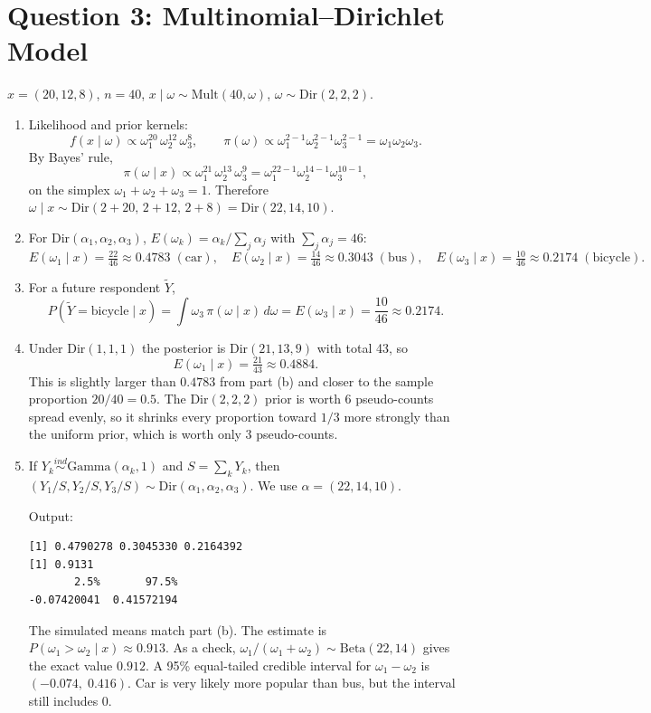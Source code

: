 \documentclass[11pt]{article}
\begin{document}
\section*{Question 3: Multinomial--Dirichlet Model}

$x = (20, 12, 8)$, $n = 40$, $x \mid \omega \sim \text{Mult}(40, \omega)$, $\omega \sim \text{Dir}(2,2,2)$.

\begin{enumerate}
\item Likelihood and prior kernels:
\[
f(x\mid\omega) \propto \omega_1^{20}\,\omega_2^{12}\,\omega_3^{8}, \qquad
\pi(\omega) \propto \omega_1^{2-1}\omega_2^{2-1}\omega_3^{2-1} = \omega_1\omega_2\omega_3 .
\]
By Bayes' rule,
\[
\pi(\omega\mid x) \propto \omega_1^{21}\,\omega_2^{13}\,\omega_3^{9}
= \omega_1^{22-1}\omega_2^{14-1}\omega_3^{10-1},
\]
on the simplex $\omega_1+\omega_2+\omega_3 = 1$. Therefore
$\omega \mid x \sim \text{Dir}(2+20,\, 2+12,\, 2+8) = \text{Dir}(22, 14, 10)$.

\item For $\text{Dir}(\alpha_1,\alpha_2,\alpha_3)$, $E(\omega_k) = \alpha_k / \sum_j \alpha_j$ with $\sum_j\alpha_j = 46$:
\[
E(\omega_1\mid x) = \tfrac{22}{46} \approx 0.4783 \;(\text{car}), \quad
E(\omega_2\mid x) = \tfrac{14}{46} \approx 0.3043 \;(\text{bus}), \quad
E(\omega_3\mid x) = \tfrac{10}{46} \approx 0.2174 \;(\text{bicycle}).
\]

\item For a future respondent $\tilde Y$,
\[
P(\tilde Y = \text{bicycle}\mid x) = \int \omega_3\,\pi(\omega\mid x)\,d\omega = E(\omega_3 \mid x) = \frac{10}{46} \approx 0.2174 .
\]

\item Under $\text{Dir}(1,1,1)$ the posterior is $\text{Dir}(21, 13, 9)$ with total 43, so
\[
E(\omega_1 \mid x) = \tfrac{21}{43} \approx 0.4884 .
\]
This is slightly larger than $0.4783$ from part (b) and closer to the sample proportion $20/40 = 0.5$. The $\text{Dir}(2,2,2)$ prior is worth 6 pseudo-counts spread evenly, so it shrinks every proportion toward $1/3$ more strongly than the uniform prior, which is worth only 3 pseudo-counts.

\item If $Y_k \overset{ind}{\sim} \text{Gamma}(\alpha_k, 1)$ and $S = \sum_k Y_k$, then $(Y_1/S, Y_2/S, Y_3/S) \sim \text{Dir}(\alpha_1,\alpha_2,\alpha_3)$. We use $\alpha = (22,14,10)$.

Output:
\begin{lstlisting}[style=out]
[1] 0.4790278 0.3045330 0.2164392
[1] 0.9131
       2.5%       97.5%
-0.07420041  0.41572194
\end{lstlisting}
The simulated means match part (b). The estimate is $P(\omega_1 > \omega_2 \mid x) \approx 0.913$. As a check, $\omega_1/(\omega_1+\omega_2) \sim \text{Beta}(22,14)$ gives the exact value $0.912$. A 95\% equal-tailed credible interval for $\omega_1 - \omega_2$ is $(-0.074,\; 0.416)$. Car is very likely more popular than bus, but the interval still includes 0.
\end{enumerate}
\end{document}
